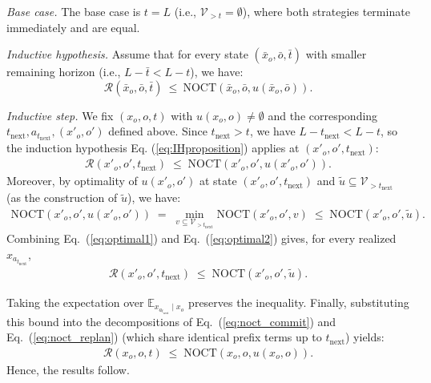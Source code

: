 \emph{Base case.} The base case is $t=L$ (i.e., $\mathcal{V}_{>t}=\emptyset$), where both strategies
terminate immediately and are equal.


\emph{Inductive hypothesis.} Assume that for every state $(\bar x_o,\bar o,\bar t)$
with smaller remaining horizon (i.e., $L-\bar t < L-t$), we have:
\begin{equation}
\mathcal{R}(\bar x_o,\bar o,\bar t)\ \le\ \mathrm{NOCT}(\bar x_o,\bar o, u(\bar x_o,\bar o)).
\label{eq:IHproposition}
\end{equation}



\emph{Inductive step.} We fix $(x_o,o,t)$ with $u(x_o,o)\neq\emptyset$ and the corresponding
$t_{\text{next}},a_{t_{\text{next}}},(x'_o,o')$ defined above. Since $t_{\text{next}} > t$,
we have $L-t_{\text{next}} < L-t$, so the induction hypothesis Eq. (\ref{eq:IHproposition}) applies at
$(x'_o,o',t_{\text{next}})$:
\begin{align}
\mathcal{R}(x'_o,o',t_{\text{next}})\;\le\;\mathrm{NOCT}(x'_o,o',u(x'_o,o')).
\label{eq:optimal1}
\end{align}
Moreover, by optimality of $u(x'_o,o')$ at state $(x'_o,o',t_{\text{next}})$ and $\tilde u \subseteq \mathcal{V}_{>t_{\text{next}}}$ (as the construction 
of $\tilde u$), we have:
\begin{align}
\mathrm{NOCT}(x'_o,o',u(x'_o,o')) \;=\; \min_{v\subseteq \mathcal{V}_{>t_{\text{next}}}}
\mathrm{NOCT}(x'_o,o',v)
\;\le\; \mathrm{NOCT}(x'_o,o',\tilde u).
\label{eq:optimal2}
\end{align}
Combining Eq.~(\ref{eq:optimal1}) and Eq.~(\ref{eq:optimal2}) gives, for every realized
$x_{a_{t_{\text{next}}}}$,
\begin{align*}    
\mathcal{R}(x'_o,o',t_{\text{next}})\;\le\;\mathrm{NOCT}(x'_o,o',\tilde u).
\end{align*}

Taking the expectation over $\mathbb{E}_{x_{a_{t_{\text{next}}}} \mid x_o}$ preserves the inequality. Finally, substituting this bound into the decompositions of Eq.~(\ref{eq:noct_commit}) and Eq.~(\ref{eq:noct_replan}) (which share identical prefix terms up to $t_{\text{next}}$) yields:
\begin{align*}
\mathcal{R}(x_o,o,t)\;\le\;\mathrm{NOCT}(x_o,o,u(x_o,o)).
\end{align*}
Hence, the results follow. 

